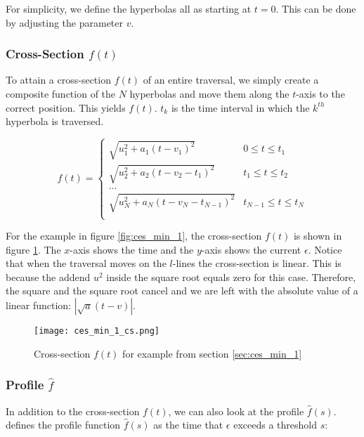 For simplicity, we define the hyperbolas all as starting at $t=0$. This can be done by adjusting the parameter $v$.


\subsubsection{Cross-Section $f(t)$}

To attain a cross-section $f(t)$ of an entire traversal, we simply create a composite function of the $N$ hyperbolas and move them along the $t$-axis to the correct position. This yields $f(t)$. $t_k$ is the time interval in which the $k^{th}$ hyperbola is traversed.

\[ f(t) =
\begin{cases} 
	\sqrt{u_1^2 + a_1(t - v_1)^2} & 0 \leq t \leq t_1 \\
	\sqrt{u_2^2 + a_2(t - v_2 - t_1)^2} & t_1 \leq t \leq t_2 \\
	\dots \\
	\sqrt{u_N^2 + a_N(t - v_N - t_{N-1})^2} & t_{N-1} \leq t \leq t_N \\
\end{cases}
\]

For the example in figure \ref{fig:ces_min_1}, the cross-section $f(t)$ is shown in figure \ref{fig:ces_min_1_cs}. The $x$-axis shows the time and the $y$-axis shows the current $\epsilon$. Notice that when the traversal moves on the $l$-lines the cross-section is linear. This is because the addend $u^2$ inside the square root equals zero for this case. Therefore, the square and the square root cancel and we are left with the absolute value of a linear function: $\left| \sqrt{a}(t - v) \right|$.

 \begin{figure}[H]
    \centering
    
    \texttt{[image: ces\_min\_1\_cs.png]}
		
	\caption{Cross-section $f(t)$ for example from section \ref{sec:ces_min_1}\protect\footnotemark}
    \label{fig:ces_min_1_cs}
\end{figure}


\subsubsection{Profile $\hat{f}$}

In addition to the cross-section $f(t)$, we can also look at the profile $\hat{f}(s)$. \citeauthor{rotelex} defines the profile function $\hat{f}(s)$ as the time that $\epsilon$ exceeds a threshold $s$:

